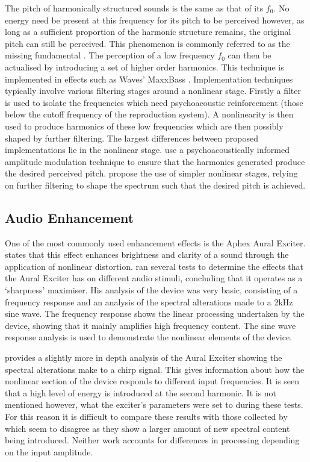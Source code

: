 		The pitch of harmonically structured sounds is the same as that of its $f_{0}$. No energy need be present
		at this frequency for its pitch to be perceived however, as long as a sufficient proportion of the harmonic
		structure remains, the original pitch can still be perceived. This phenomenon is commonly referred to as
		the missing fundamental \citep{plack2005the}. The perception of a low frequency $f_{0}$ can then be
		actualised by introducing a set of higher order harmonics. This technique is implemented in effects such as
		Waves' MaxxBass \citep{ben-tzur1999the}. Implementation techniques typically involve various filtering
		stages around a nonlinear stage. Firstly a filter is used to isolate the frequencies which need
		psychoacoustic reinforcement (those below the cutoff frequency of the reproduction system). A nonlinearity
		is then used to produce harmonics of these low frequencies which are then possibly shaped by further
		filtering. The largest differences between proposed implementations lie in the nonlinear stage.
		\citet{gan2001virtual} use a psychoacoustically informed amplitude modulation technique to ensure that the
		harmonics generated produce the desired perceived pitch. \citet{larsen2002reproducing} propose the use of
		simpler nonlinear stages, relying on further filtering to shape the spectrum such that the desired pitch is
		achieved.

	\subsection{Audio Enhancement}
	\label{sec:Excitation-Uses-Enhancement}
		One of the most commonly used enhancement effects is the Aphex Aural Exciter. \citet{shekar2013modeling}
		states that this effect enhances brightness and clarity of a sound through the application of nonlinear
		distortion. \citet{chalupper2000aural} ran several tests to determine the effects that the Aural Exciter
		has on different audio stimuli, concluding that it operates as a `sharpness' maximiser. His analysis of the
		device was very basic, consisting of a frequency response and an analysis of the spectral alterations made
		to a 2kHz sine wave. The frequency response shows the linear processing undertaken by the device, showing
		that it mainly amplifies high frequency content. The sine wave response analysis is used to demonstrate the
		nonlinear elements of the device. 

		\citet{dutilleux2011nonlinear} provides a slightly more in depth analysis of the Aural Exciter showing the
		spectral alterations make to a chirp signal. This gives information about how the nonlinear section of the
		device responds to different input frequencies. It is seen that a high level of energy is introduced at the
		second harmonic. It is not mentioned however, what the exciter's parameters were set to during these tests.
		For this reason it is difficult to compare these results with those collected by \citet{chalupper2000aural}
		which seem to disagree as they show a larger amount of new spectral content being introduced. Neither work
		accounts for differences in processing depending on the input amplitude.

